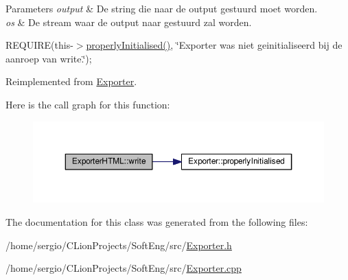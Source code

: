\begin{DoxyParams}{Parameters}
{\em output} & De string die naar de output gestuurd moet worden. \\
\hline
{\em os} & De stream waar de output naar gestuurd zal worden.\\
\hline
\end{DoxyParams}
R\+E\+Q\+U\+I\+RE(this-\/$>$\hyperlink{class_exporter_aafd9df9210aeefd7bb7fd434fc317cf0}{properly\+Initialised()}, \char`\"{}\+Exporter was niet geinitialiseerd bij de aanroep van write.\char`\"{});~\newline


Reimplemented from \hyperlink{class_exporter_ab3736803133eb727cf87a7306f91eb11}{Exporter}.

Here is the call graph for this function\+:
\nopagebreak
\begin{figure}[H]
\begin{center}
\leavevmode
\includegraphics[width=350pt]{class_exporter_h_t_m_l_ace2649c240282289d4cb3bfbd19e427c_cgraph}
\end{center}
\end{figure}


The documentation for this class was generated from the following files\+:\begin{DoxyCompactItemize}
\item 
/home/sergio/\+C\+Lion\+Projects/\+Soft\+Eng/src/\hyperlink{_exporter_8h}{Exporter.\+h}\item 
/home/sergio/\+C\+Lion\+Projects/\+Soft\+Eng/src/\hyperlink{_exporter_8cpp}{Exporter.\+cpp}\end{DoxyCompactItemize}
